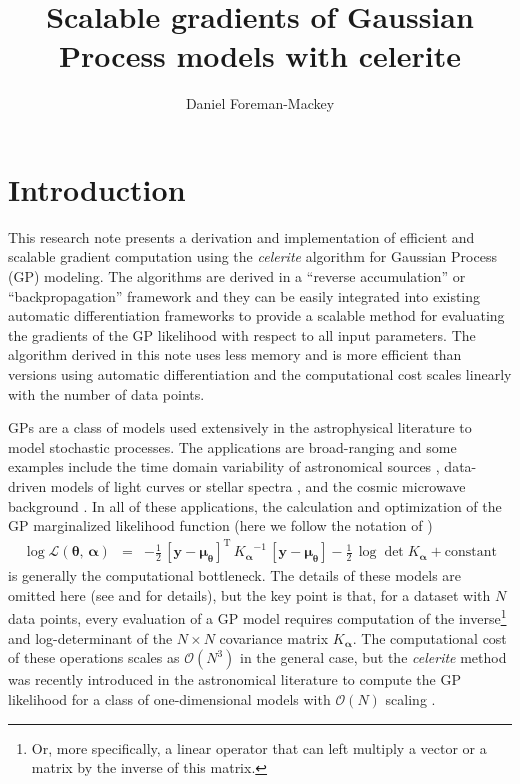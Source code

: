 \documentclass[rnaas]{aastex62}
\newcommand{\eqlabel}[1]{\label{eq:#1}}
\newcommand{\T}{\ensuremath{\mathrm{T}}}
\newcommand{\bvec}[1]{{\ensuremath{\boldsymbol{#1}}}}
\begin{document}
\raggedbottom\sloppy\sloppypar\frenchspacing

\title{%
    Scalable gradients of Gaussian Process models with celerite
}

\author[0000-0002-9328-5652]{Daniel Foreman-Mackey}


\section{Introduction}

This research note presents a derivation and implementation of efficient and
scalable gradient computation using the \emph{celerite} algorithm for Gaussian
Process (GP) modeling.
The algorithms are derived in a ``reverse accumulation'' or
``backpropagation'' framework and they can be easily integrated into existing
automatic differentiation frameworks to provide a scalable method for
evaluating the gradients of the GP likelihood with respect to all input
parameters.
The algorithm derived in this note uses less memory and is more efficient than
versions using automatic differentiation and the computational cost scales
linearly with the number of data points.

GPs \citep{Rasmussen:2006} are a class of models used
extensively in the astrophysical literature to model stochastic processes.
The applications are broad-ranging and some examples include the time domain
variability of astronomical sources \citep{Brewer:2009, Kelly:2014,
Haywood:2014, Rajpaul:2015, Foreman-Mackey:2017}, data-driven models of light
curves or stellar spectra \citep{Wang:2012, Luger:2016, Czekala:2017}, and the
cosmic microwave background \citep{Bond:1987,Wandelt:2003}.
In all of these applications, the calculation and optimization of the GP
marginalized likelihood function (here we follow the notation of
\citealt{Foreman-Mackey:2017})
\begin{eqnarray}\eqlabel{loglike}
\log \mathcal{L}(\bvec{\theta},\,\bvec{\alpha}) &=&
    -\frac{1}{2}\,\left[\bvec{y} - \bvec{\mu}_\bvec{\theta}\right]^\T\,
        {K_\bvec{\alpha}}^{-1}\,\left[\bvec{y}-\bvec{\mu}_\bvec{\theta}\right]
    -\frac{1}{2}\,\log\det K_\bvec{\alpha} + \mathrm{constant}
\end{eqnarray}
is generally the computational bottleneck.
The details of these models are omitted here (see \citealt{Rasmussen:2006} and
\citealt{Foreman-Mackey:2017} for details), but the key point is that, for a
dataset with $N$ data points, every evaluation of a GP model requires
computation of the inverse\footnote{Or, more specifically, a linear operator
that can left multiply a vector or a matrix by the inverse of this matrix.}
and log-determinant of the $N \times N$ covariance matrix $K_\bvec{\alpha}$.
The computational cost of these operations scales as $\mathcal{O}(N^3)$ in the
general case, but the \emph{celerite} method was recently introduced in the
astronomical literature to compute the GP likelihood for a class of
one-dimensional models with $\mathcal{O}(N)$ scaling
\citep{Ambikasaran:2015, Foreman-Mackey:2017}.
\end{document}
